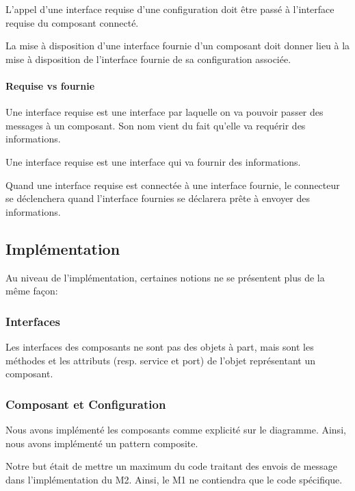 \documentclass[a4paper, titlepage]{article}
\begin{document}
				L'appel d'une interface requise d'une configuration doit être passé
				à l'interface requise du composant connecté.
				
				La mise à disposition d'une interface fournie d'un composant doit
				donner lieu à la mise à disposition de l'interface fournie de sa
				configuration associée.
				
			\paragraph{Requise vs fournie}
				\label{def:reqfour}
				Une interface requise est une interface par laquelle on va pouvoir
				passer des messages à un composant. Son nom vient du fait qu'elle va
				requérir des informations.
				
				Une interface requise est une interface qui va fournir des
				informations.
				
				Quand une interface requise est connectée à une interface fournie,
				le connecteur se déclenchera quand l'interface fournies se déclarera
				prête à envoyer des informations.
				
			
			
		\subsection{Implémentation}
		
		Au niveau de l'implémentation, certaines notions ne se présentent plus de
		la même façon:
		
		\subsubsection{Interfaces}
		
			Les interfaces des composants ne sont pas des objets à part, mais sont
			les méthodes et les attributs (resp. service et port) de l'objet
			représentant un composant.
			
		\subsubsection{Composant et Configuration}
		
			Nous avons implémenté les composants comme explicité sur le diagramme.
			Ainsi, nous avons implémenté un pattern composite.
			
			Notre but était de mettre un maximum du code traitant des envois de
			message dans l'implémentation du M2. Ainsi, le M1 ne contiendra que le
			code spécifique.
			
\end{document}
